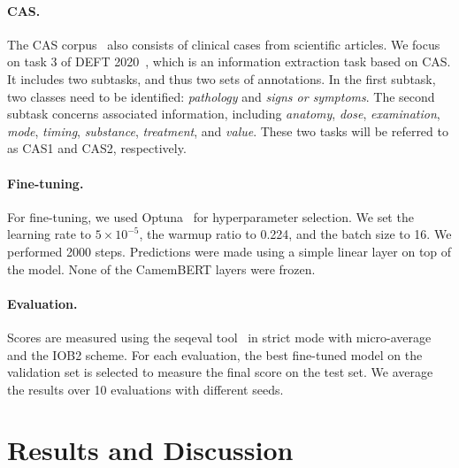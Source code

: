 \paragraph{CAS.} The CAS corpus~\citep{grouin_clinical_2019} also consists of clinical cases from scientific articles. We focus on task 3 of DEFT 2020~\citep{cardon_presentation_2020}, which is an information extraction task based on CAS. It includes two subtasks, and thus two sets of annotations. In the first subtask, two classes need to be identified: \textit{pathology} and \textit{signs or symptoms}. The second subtask concerns associated information, including \textit{anatomy}, \textit{dose}, \textit{examination}, \textit{mode}, \textit{timing}, \textit{substance}, \textit{treatment}, and \textit{value}. These two tasks will be referred to as CAS1 and CAS2, respectively.

\paragraph{Fine-tuning.} For fine-tuning, we used Optuna~\citep{akiba_optuna_2019} for hyperparameter selection. We set the learning rate to $5 \times 10^{-5}$, the warmup ratio to 0.224, and the batch size to 16. We performed 2000 steps. Predictions were made using a simple linear layer on top of the model. None of the CamemBERT layers were frozen.

\paragraph{Evaluation.} Scores are measured using the seqeval tool~\citep{seqeval} in strict mode with micro-average and the IOB2 scheme. For each evaluation, the best fine-tuned model on the validation set is selected to measure the final score on the test set. We average the results over 10 evaluations with different seeds.


\section{Results and Discussion}

